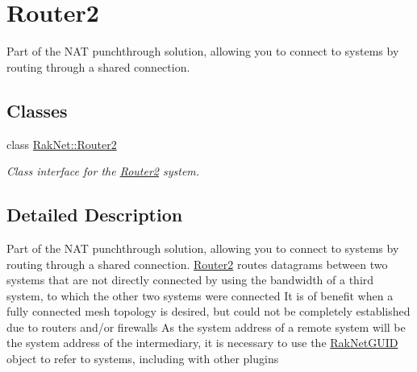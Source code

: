 \hypertarget{group___r_o_u_t_e_r__2___g_r_o_u_p}{\section{Router2}
\label{group___r_o_u_t_e_r__2___g_r_o_u_p}
}


Part of the N\-A\-T punchthrough solution, allowing you to connect to systems by routing through a shared connection.  


\subsection*{Classes}
\begin{DoxyCompactItemize}
\item 
class \hyperlink{class_rak_net_1_1_router2}{Rak\-Net\-::\-Router2}
\begin{DoxyCompactList}\small\item\em Class interface for the \hyperlink{class_rak_net_1_1_router2}{Router2} system. \end{DoxyCompactList}\end{DoxyCompactItemize}


\subsection{Detailed Description}
Part of the N\-A\-T punchthrough solution, allowing you to connect to systems by routing through a shared connection. \hyperlink{class_rak_net_1_1_router2}{Router2} routes datagrams between two systems that are not directly connected by using the bandwidth of a third system, to which the other two systems were connected It is of benefit when a fully connected mesh topology is desired, but could not be completely established due to routers and/or firewalls As the system address of a remote system will be the system address of the intermediary, it is necessary to use the \hyperlink{struct_rak_net_1_1_rak_net_g_u_i_d}{Rak\-Net\-G\-U\-I\-D} object to refer to systems, including with other plugins 